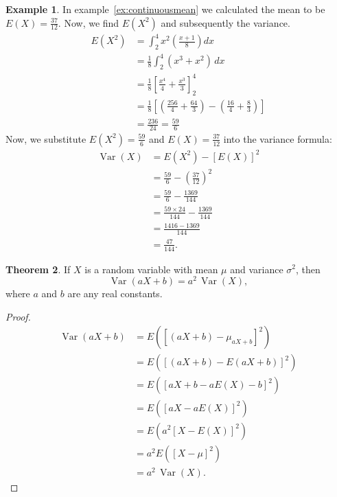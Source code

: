 \documentclass[12pt,a4paper]{report}
\theoremstyle{definition}
\newtheorem{thm}{Theorem}[section]
\newtheorem{example}[thm]{Example}
\theoremstyle{plain}
\theoremstyle{definition}
\begin{document}
\begin{example}
In example~\ref{ex:continuousmean} we calculated the mean to be $E(X) = \frac{37}{12}$. Now, we find $E(X^2)$ and subsequently the variance.
\[\begin{aligned}
E(X^2) &= \int_{2}^{4} x^2 \left( \frac{x+1}{8} \right) dx \\
&= \frac{1}{8} \int_{2}^{4} (x^3 + x^2) \, dx \\
&= \frac{1}{8} \left[ \frac{x^4}{4} + \frac{x^3}{3} \right]_{2}^{4} \\
&= \frac{1}{8} \left[ \left( \frac{256}{4} + \frac{64}{3} \right) - \left( \frac{16}{4} + \frac{8}{3} \right) \right] \\
& = \frac{236}{24}
 = \frac{59}{6}
\end{aligned}\]
Now, we substitute $E(X^2) = \frac{59}{6}$ and $E(X) = \frac{37}{12}$ into the variance formula:
\[\begin{aligned}
\operatorname{Var}(X) &= E(X^2) - [E(X)]^2 \\
&= \frac{59}{6} - \left( \frac{37}{12} \right)^2 \\
&= \frac{59}{6} - \frac{1369}{144} \\
&= \frac{59 \times 24}{144} - \frac{1369}{144} \\
&= \frac{1416 - 1369}{144} \\
& = \frac{47}{144}.
\end{aligned}\]
\end{example}


\begin{thm}
If $X$ is a random variable with mean $\mu$ and variance $\sigma^2$, then \[\operatorname{Var}(aX + b) = a^2 \, \operatorname{Var}(X),\] where $a$ and $b$ are any real constants.
\end{thm}


\begin{proof}
\begin{align*}
\operatorname{Var}(aX + b) & = E\left([(aX + b) - \mu_{aX + b}]^2\right)\\
& = E\left([(aX + b) - E(aX + b)]^2\right)\\
& = E\left([aX + b - aE(X) - b]^2\right)\\
& = E\left([aX - aE(X)]^2\right)\\
& = E\left(a^2 [X - E(X)]^2\right)\\
& = a^2E\left([X-\mu]^2\right)\\
& = a^2\, \operatorname{Var}(X).
\end{align*}
\end{proof}
\end{document}
